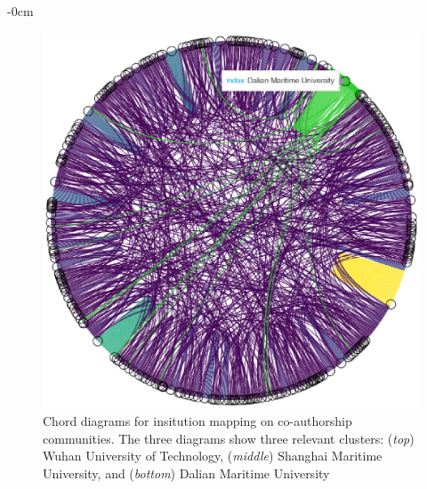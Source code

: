 \documentclass[jmse,review,submit,pdftex,moreauthors]{Definitions/mdpi}
\begin{document}
\begin{adjustwidth}{-\extralength}{0cm}
\begin{figure}[H]
	\includegraphics[height=0.3\textheight, keepaspectratio]{pics/coauthorship_inst_chord_3.eps}
	\caption{Chord diagrams for insitution mapping on co-authorship communities. The three diagrams show three relevant clusters: (\textit{top}) Wuhan University of Technology, (\textit{middle}) Shanghai Maritime University, and (\textit{bottom}) Dalian Maritime University}\label{fig:fig6}
\end{figure}


\end{adjustwidth}
\end{document}
